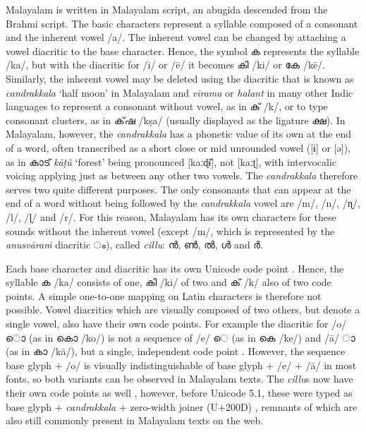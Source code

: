 \documentclass[a4paper]{article}
\newcommand{\ipa}[1]{{\cmuIPA{}#1}}
\begin{document}
Malayalam is written in Malayalam script, an abugida descended from the Brahmi script. The basic characters represent a syllable composed of a consonant and the inherent vowel /a/. The inherent vowel can be changed by attaching a vowel diacritic to the base character. Hence, the symbol ക represents the syllable /ka/, but with the diacritic for /i/ or /ē/ it becomes കി /ki/ or കേ /kē/. Similarly, the inherent vowel may be deleted using the diacritic that is known as \textit{candrakkala} `half moon' in Malayalam and \textit{virama} or \textit{halant} in many other Indic languages to represent a consonant without vowel, as in ക് /k/, or to type consonant clusters, as in ക്​ഷ /kṣa/ (usually displayed as the ligature ക്ഷ). In Malayalam, however, the \textit{candrakkala} has a phonetic value of its own at the end of a word, often transcribed as a short close or mid unrounded vowel ([\ipa{ɨ}] or [\ipa{ə}]), as in കാട് \textit{kāṭŭ} `forest' being pronounced [\ipa{kaːɖɨ̆}], not [\ipa{kaːʈ}], with intervocalic voicing applying just as between any other two vowels. The \textit{candrakkala} therefore serves two quite different purposes. The only consonants that can appear at the end of a word without being followed by the \textit{candrakkala} vowel are /m/, /n/, /\ipa{ɳ}/, /l/, /\ipa{ɭ}/ and /r/. For this reason, Malayalam has its own characters for these sounds without the inherent vowel (except /m/, which is represented by the \textit{anusvāraṁ} diacritic ം), called \textit{cillu}: ൻ, ൺ, ൽ, ൾ and ർ.

Each base character and diacritic has its own Unicode code point \parencite[p.~334ff]{unicode5}. Hence, the syllable ക /ka/ consists of one, കി /ki/ of two and ക് /k/ also of two code points. A simple one-to-one mapping on Latin characters is therefore not possible. Vowel diacritics which are visually composed of two others, but denote a single vowel, also have their own code points. For example the diacritic for /o/ ൊ (as in കൊ /ko/) is not a sequence of /e/ െ (as in കെ /ke/) and /ā/ ാ (as in കാ /kā/), but a single, independent code point \parencite[p.~334f]{unicode5}. However, the sequence base glyph + /o/ is visually indistinguishable of base glyph + /e/ + /ā/ in most fonts, so both variants can be observed in Malayalam texts. The \textit{cillu}s now have their own code points as well \parencite{unicode51}, however, before Unicode 5.1, these were typed as base glyph + \textit{candrakkala} + zero-width joiner (U+200D) \parencite[p.~336f]{unicode5}, remnants of which are also still commonly present in Malayalam texts on the web.
\end{document}
